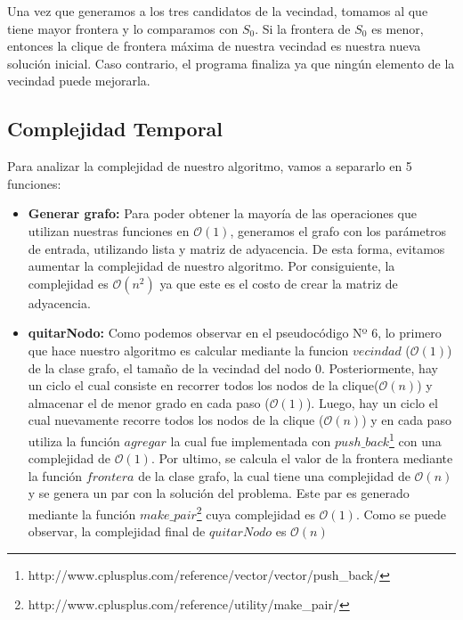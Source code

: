 Una vez que generamos a los tres candidatos de la vecindad, tomamos al que tiene mayor frontera y lo comparamos con $S_{0}$. Si la frontera de $S_{0}$ es menor, entonces la clique de frontera máxima de nuestra vecindad es nuestra nueva solución inicial. Caso contrario, el programa finaliza ya que ningún elemento de la vecindad puede mejorarla.

\subsection{Complejidad Temporal}
Para analizar la complejidad de nuestro algoritmo, vamos a separarlo en 5 funciones:
\begin{itemize}
\item \textbf{Generar grafo:} \newline
Para poder obtener la mayoría de las operaciones que utilizan nuestras funciones en $\mathcal{O}(1)$, generamos el grafo con los parámetros de entrada, utilizando lista y matriz de adyacencia. De esta forma, evitamos aumentar la complejidad de nuestro algoritmo. Por consiguiente, la complejidad es $\mathcal{O}(n^{2})$ ya que este es el costo de crear la matriz de adyacencia.

\item \textbf{quitarNodo:} \newline
Como podemos observar en el pseudocódigo Nº 6, lo primero que hace nuestro algoritmo es calcular mediante la funcion $vecindad$ ($\mathcal{O}(1)$) de la clase grafo, el tamaño de la vecindad del nodo 0. Posteriormente, hay un ciclo el cual consiste en recorrer todos los nodos de la clique($\mathcal{O}(n)$) y almacenar el de menor grado en cada paso ($\mathcal{O}(1)$).
\newline
Luego, hay un ciclo el cual nuevamente recorre todos los nodos de la clique ($\mathcal{O}(n)$) y en cada paso utiliza la función $agregar$ la cual fue implementada con $push\_back$\footnote{http://www.cplusplus.com/reference/vector/vector/push\_back/} con una complejidad de $\mathcal{O}(1)$.
\newline
Por ultimo, se calcula el valor de la frontera mediante la función $frontera$ de la clase grafo, la cual tiene una complejidad de $\mathcal{O}(n)$ y se genera un par con la solución del problema. Este par es generado mediante la función $make\_pair$\footnote{http://www.cplusplus.com/reference/utility/make\_pair/} cuya complejidad es $\mathcal{O}(1)$.
\newline
Como se puede observar, la complejidad final de $quitarNodo$ es $\mathcal{O}(n)$


\end{itemize}
